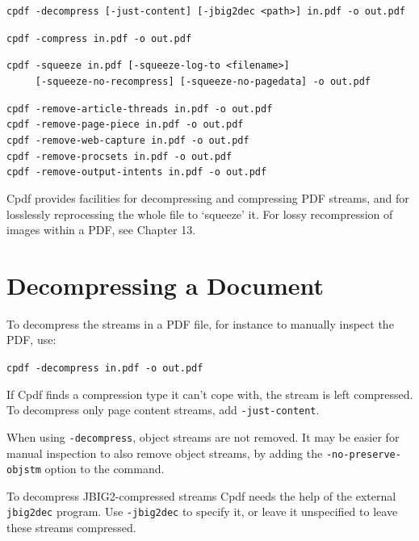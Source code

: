 \documentclass{book}
\begin{document}
  \begin{framed}
     \small\noindent\verb!cpdf -decompress [-just-content] [-jbig2dec <path>] in.pdf -o out.pdf!

     \vspace{1.5mm}
     \noindent\verb!cpdf -compress in.pdf -o out.pdf!
     
     \vspace{1.5mm}
     \noindent\verb!cpdf -squeeze in.pdf [-squeeze-log-to <filename>]!\\
     \noindent\verb!     [-squeeze-no-recompress] [-squeeze-no-pagedata] -o out.pdf!

     \vspace{1.5mm}
     \noindent\verb!cpdf -remove-article-threads in.pdf -o out.pdf!\\
     \noindent\verb!cpdf -remove-page-piece in.pdf -o out.pdf!\\
     \noindent\verb!cpdf -remove-web-capture in.pdf -o out.pdf!\\
     \noindent\verb!cpdf -remove-procsets in.pdf -o out.pdf!\\
     \noindent\verb!cpdf -remove-output-intents in.pdf -o out.pdf!
   \end{framed}

  Cpdf provides facilities for decompressing and compressing PDF streams, and for losslessly reprocessing the whole file to `squeeze' it. For lossy recompression of images within a PDF, see Chapter 13.
  \section{Decompressing a Document}
  To decompress the streams in a PDF file, for instance to manually inspect the
PDF, use:

  \begin{framed}
   \noindent\small\verb!cpdf -decompress in.pdf -o out.pdf!
  \end{framed}

  \noindent If Cpdf finds a compression type it can't cope with, the stream is left compressed. To decompress only page content streams, add \texttt{-just-content}.

When using \texttt{-decompress}, object streams are not removed. It may be easier for manual inspection to also remove object streams, by adding the \texttt{-no-preserve-objstm} option to the command.

To decompress JBIG2-compressed streams Cpdf needs the help of the external \texttt{jbig2dec} program. Use \texttt{-jbig2dec} to specify it, or leave it unspecified to leave these streams compressed.
\end{document}
